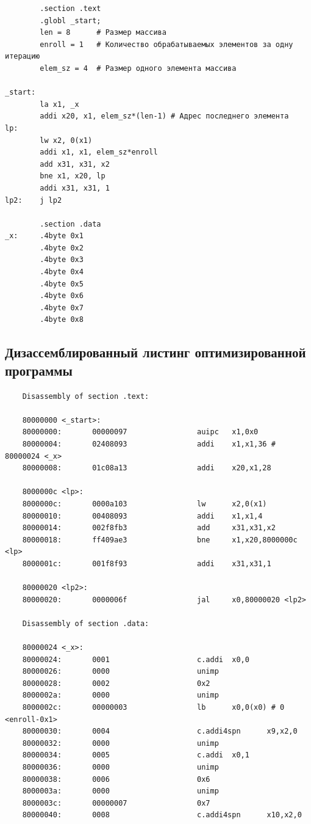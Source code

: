 \begin{lstlisting}
		.section .text
		.globl _start;
		len = 8      # Размер массива
		enroll = 1   # Количество обрабатываемых элементов за одну итерацию
		elem_sz = 4  # Размер одного элемента массива

_start:
		la x1, _x
		addi x20, x1, elem_sz*(len-1) # Адрес последнего элемента
lp:
		lw x2, 0(x1)
		addi x1, x1, elem_sz*enroll
		add x31, x31, x2
		bne x1, x20, lp
		addi x31, x31, 1
lp2: 	j lp2

		.section .data
_x:     .4byte 0x1
		.4byte 0x2
		.4byte 0x3
		.4byte 0x4
		.4byte 0x5
		.4byte 0x6
		.4byte 0x7
		.4byte 0x8
\end{lstlisting}

\pagebreak

\subsection{Дизассемблированный листинг оптимизированной программы}

\begin{lstlisting}
	Disassembly of section .text:
	
	80000000 <_start>:
	80000000:       00000097                auipc   x1,0x0
	80000004:       02408093                addi    x1,x1,36 # 80000024 <_x>
	80000008:       01c08a13                addi    x20,x1,28
	
	8000000c <lp>:
	8000000c:       0000a103                lw      x2,0(x1)
	80000010:       00408093                addi    x1,x1,4
	80000014:       002f8fb3                add     x31,x31,x2
	80000018:       ff409ae3                bne     x1,x20,8000000c <lp>
	8000001c:       001f8f93                addi    x31,x31,1
	
	80000020 <lp2>:
	80000020:       0000006f                jal     x0,80000020 <lp2>
	
	Disassembly of section .data:
	
	80000024 <_x>:
	80000024:       0001                    c.addi  x0,0
	80000026:       0000                    unimp
	80000028:       0002                    0x2
	8000002a:       0000                    unimp
	8000002c:       00000003                lb      x0,0(x0) # 0 <enroll-0x1>
	80000030:       0004                    c.addi4spn      x9,x2,0
	80000032:       0000                    unimp
	80000034:       0005                    c.addi  x0,1
	80000036:       0000                    unimp
	80000038:       0006                    0x6
	8000003a:       0000                    unimp
	8000003c:       00000007                0x7
	80000040:       0008                    c.addi4spn      x10,x2,0
\end{lstlisting}

